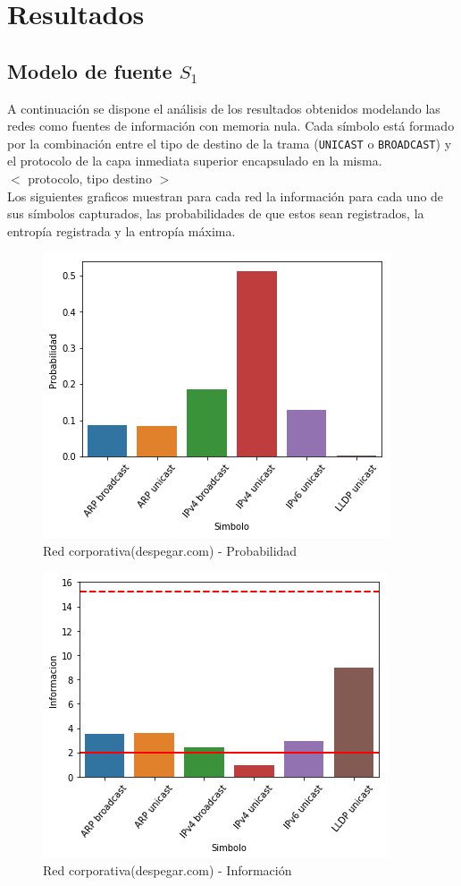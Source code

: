 \section{Resultados}

\subsection{Modelo de fuente $S_1$}

A continuación se dispone el análisis de los resultados obtenidos modelando las redes como fuentes de información con memoria nula. Cada símbolo está formado por la combinación entre el tipo de destino de la trama (\texttt{UNICAST} o \texttt{BROADCAST}) y el protocolo de la capa inmediata superior encapsulado en la misma. \\

$<$ protocolo, tipo destino $>$ \\


Los siguientes graficos muestran para cada red la información para cada uno de sus símbolos capturados, las probabilidades de que estos sean registrados, la entropía registrada y la entropía máxima.

\begin{figure}[H]
	\centering
	\includegraphics[width=.5\linewidth]{imagenes/despegar_barras_prob}
	\caption{Red corporativa(despegar.com) - Probabilidad}
\end{figure}

\begin{figure}[H]
	\centering
	\includegraphics[width=.5\linewidth]{imagenes/despegar_barras_info}
	\caption{Red corporativa(despegar.com) - Información}
\end{figure}

